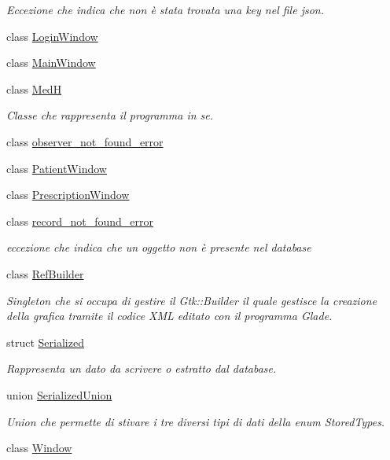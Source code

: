 \begin{DoxyCompactItemize}
\begin{DoxyCompactList}\small\item\em Eccezione che indica che non è stata trovata una key nel file json. \end{DoxyCompactList}\item 
class \mbox{\hyperlink{classmm_1_1_login_window}{Login\+Window}}
\item 
class \mbox{\hyperlink{classmm_1_1_main_window}{Main\+Window}}
\item 
class \mbox{\hyperlink{classmm_1_1_med_h}{MedH}}
\begin{DoxyCompactList}\small\item\em Classe che rappresenta il programma in se. \end{DoxyCompactList}\item 
class \mbox{\hyperlink{classmm_1_1observer__not__found__error}{observer\+\_\+not\+\_\+found\+\_\+error}}
\item 
class \mbox{\hyperlink{classmm_1_1_patient_window}{Patient\+Window}}
\item 
class \mbox{\hyperlink{classmm_1_1_prescription_window}{Prescription\+Window}}
\item 
class \mbox{\hyperlink{classmm_1_1record__not__found__error}{record\+\_\+not\+\_\+found\+\_\+error}}
\begin{DoxyCompactList}\small\item\em eccezione che indica che un oggetto non è presente nel database \end{DoxyCompactList}\item 
class \mbox{\hyperlink{classmm_1_1_ref_builder}{Ref\+Builder}}
\begin{DoxyCompactList}\small\item\em Singleton che si occupa di gestire il Gtk\+::\+Builder il quale gestisce la creazione della grafica tramite il codice X\+ML editato con il programma Glade. \end{DoxyCompactList}\item 
struct \mbox{\hyperlink{structmm_1_1_serialized}{Serialized}}
\begin{DoxyCompactList}\small\item\em Rappresenta un dato da scrivere o estratto dal database. \end{DoxyCompactList}\item 
union \mbox{\hyperlink{unionmm_1_1_serialized_union}{Serialized\+Union}}
\begin{DoxyCompactList}\small\item\em Union che permette di stivare i tre diversi tipi di dati della enum Stored\+Types. \end{DoxyCompactList}\item 
class \mbox{\hyperlink{classmm_1_1_window}{Window}}
\end{DoxyCompactItemize}

